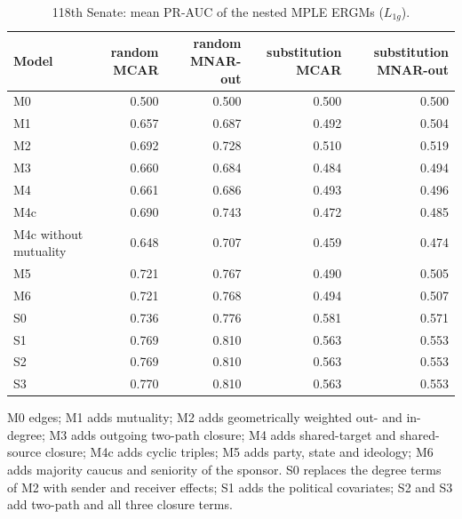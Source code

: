 \begin{table}[tbp]
\centering
\small
\caption{118th Senate: mean PR-AUC of the nested MPLE ERGMs ($L_{1g}$).}
\label{tab:ergm-ladder}
\begin{tabular}{lrrrr}
\toprule
Model & random MCAR & random MNAR-out & substitution MCAR & substitution MNAR-out \\
\midrule
M0 & 0.500 & 0.500 & 0.500 & 0.500 \\
M1 & 0.657 & 0.687 & 0.492 & 0.504 \\
M2 & 0.692 & 0.728 & 0.510 & 0.519 \\
M3 & 0.660 & 0.684 & 0.484 & 0.494 \\
M4 & 0.661 & 0.686 & 0.493 & 0.496 \\
M4c & 0.690 & 0.743 & 0.472 & 0.485 \\
M4c without mutuality & 0.648 & 0.707 & 0.459 & 0.474 \\
M5 & 0.721 & 0.767 & 0.490 & 0.505 \\
M6 & 0.721 & 0.768 & 0.494 & 0.507 \\
S0 & 0.736 & 0.776 & 0.581 & 0.571 \\
S1 & 0.769 & 0.810 & 0.563 & 0.553 \\
S2 & 0.769 & 0.810 & 0.563 & 0.553 \\
S3 & 0.770 & 0.810 & 0.563 & 0.553 \\
\bottomrule
\end{tabular}
\par\vspace{2pt}\footnotesize M0 edges; M1 adds mutuality; M2 adds geometrically weighted out- and in-degree; M3 adds outgoing two-path closure; M4 adds shared-target and shared-source closure; M4c adds cyclic triples; M5 adds party, state and ideology; M6 adds majority caucus and seniority of the sponsor. S0 replaces the degree terms of M2 with sender and receiver effects; S1 adds the political covariates; S2 and S3 add two-path and all three closure terms.
\end{table}